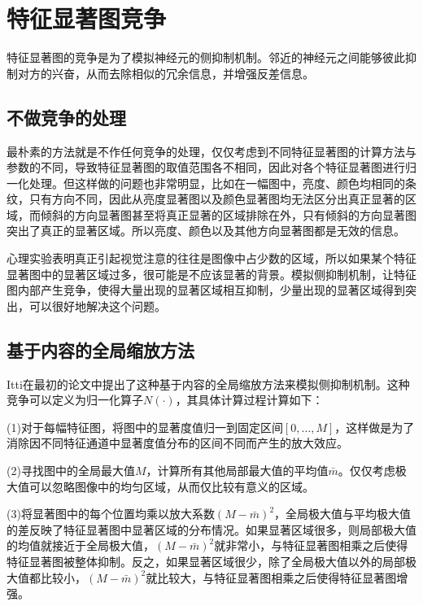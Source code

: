 \documentclass[a4paper,10pt]{article}\large
\begin{document}

\section{特征显著图竞争}

特征显著图的竞争是为了模拟神经元的侧抑制机制。邻近的神经元之间能够彼此抑制对方的兴奋，从而去除相似的冗余信息，并增强反差信息。

\subsection{不做竞争的处理}

最朴素的方法就是不作任何竞争的处理，仅仅考虑到不同特征显著图的计算方法与参数的不同，导致特征显著图的取值范围各不相同，因此对各个特征显著图进行归一化处理。但这样做的问题也非常明显，比如在一幅图中，亮度、颜色均相同的条纹，只有方向不同，因此从亮度显著图以及颜色显著图均无法区分出真正显著的区域，而倾斜的方向显著图甚至将真正显著的区域排除在外，只有倾斜的方向显著图突出了真正的显著区域。所以亮度、颜色以及其他方向显著图都是无效的信息。


心理实验表明真正引起视觉注意的往往是图像中占少数的区域，所以如果某个特征显著图中的显著区域过多，很可能是不应该显著的背景。模拟侧抑制机制，让特征图内部产生竞争，使得大量出现的显著区域相互抑制，少量出现的显著区域得到突出，可以很好地解决这个问题。

\subsection{基于内容的全局缩放方法}

Itti在最初的论文中提出了这种基于内容的全局缩放方法来模拟侧抑制机制。这种竞争可以定义为归一化算子$N(\cdot)$，其具体计算过程计算如下：


(1)对于每幅特征图，将图中的显著度值归一到固定区间$[0,\ldots,M]$，这样做是为了消除因不同特征通道中显著度值分布的区间不同而产生的放大效应。


(2)寻找图中的全局最大值$M$，计算所有其他局部最大值的平均值$\bar{m}$。仅仅考虑极大值可以忽略图像中的均匀区域，从而仅比较有意义的区域。


(3)将显著图中的每个位置均乘以放大系数$(M-\bar{m})^2$，全局极大值与平均极大值的差反映了特征显著图中显著区域的分布情况。如果显著区域很多，则局部极大值的均值就接近于全局极大值，$(M-\bar{m})^2$就非常小，与特征显著图相乘之后使得特征显著图被整体抑制。反之，如果显著区域很少，除了全局极大值以外的局部极大值都比较小，$(M-\bar{m})^2$就比较大，与特征显著图相乘之后使得特征显著图增强。
\end{document}

